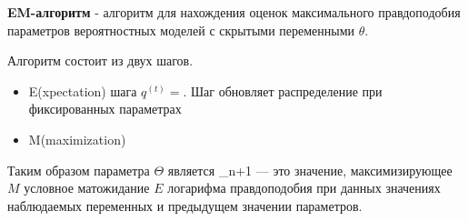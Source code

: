  \textbf{EM-алгоритм} - алгоритм для нахождения оценок
максимального правдоподобия параметров 
 вероятностных моделей с скрытыми переменными $\theta$.

Алгоритм состоит из двух шагов. \begin{itemize}
    \item E(xpectation) шага $q^{(t)} = $. Шаг 
    обновляет распределение при фиксированных параметрах
    \item M(maximization)
\end{itemize}

Таким образом параметра $\Theta$ является
{\displaystyle \Theta _{n+1}} — это значение, максимизирующее $M$ условное матожидание $E$ логарифма правдоподобия при данных значениях наблюдаемых переменных и предыдущем значении параметров. 

